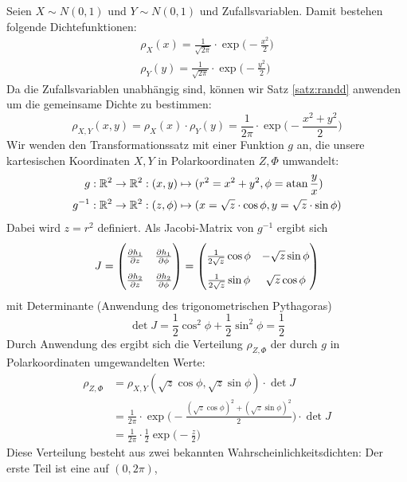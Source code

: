 Seien $X\sim N(0,1)$ und $Y\sim N(0,1)$ 
und  Zufallsvariablen. Damit bestehen folgende
Dichtefunktionen:
\begin{align*}
\rho_X(x) = \frac{1}{\sqrt{2\pi}}\cdot\exp\Big(-\frac{x^2}{2}\Big)\\
\rho_Y(y) = \frac{1}{\sqrt{2\pi}}\cdot\exp\Big(-\frac{y^2}{2}\Big)
\end{align*}
Da die Zufallsvariablen unabhängig sind, können wir Satz \ref{satz:randd}
anwenden um die gemeinsame Dichte zu bestimmen:
\[
\rho_{X,Y}(x,y) = \rho_X(x)\cdot\rho_Y(y) =
\frac{1}{2\pi}\cdot\exp\Big(-\frac{x^2+y^2}{2}\Big)
\]
Wir wenden den Transformationssatz mit einer Funktion $g$ an, die unsere
kartesischen Koordinaten $X,Y$ in Polarkoordinaten  $Z,\Phi$
umwandelt:
\begin{align*}
g: \mathbb{R}^2 \to \mathbb{R}^2: (x,y) &\mapsto (r^2 =x^2+y^2,\phi=\operatorname{atan}\frac{y}{x}) \\
g^{-1}: \mathbb{R}^2 \to \mathbb{R}^2: (z,\phi) &\mapsto (x=\sqrt{z}\cdot\cos\phi,y=\sqrt{z}\cdot\sin\phi)
\end{align*}
Dabei wird $z=r^2$ definiert. Als Jacobi-Matrix von $g^{-1}$ ergibt sich
\[
\renewcommand*{\arraystretch}{1.8}
J = \begin{pmatrix}\pd{h_1}{z} & \pd{h_1}{\phi} \\ \pd{h_2}{z} & \pd{h_2}{\phi}\end{pmatrix}
 = \begin{pmatrix}\frac{1}{2\sqrt{z}}\cos\phi & -\sqrt{z}\sin\phi \\
                  \frac{1}{2\sqrt{z}}\sin\phi &  \sqrt{z}\cos\phi\end{pmatrix}
\]
mit Determinante (Anwendung des trigonometrischen Pythagoras)
\[
\det J = \frac{1}{2}\cos^2\phi + \frac{1}{2}\sin^2\phi = \frac{1}{2}
\]
Durch Anwendung des  ergibt sich die
Verteilung $\rho_{Z,\Phi}$ der durch $g$ in Polarkoordinaten umgewandelten
Werte:
\begin{align*}
\rho_{Z,\Phi} &= \rho_{X,Y}(\sqrt{z}\cos\phi,\sqrt{z}\sin\phi)\cdot\det J \\
  &= \frac{1}{2\pi}\cdot
        \exp\Big(-\frac{(\sqrt{z}\cos\phi)^2+(\sqrt{z}\sin\phi)^2}{2}\Big)
        \cdot\det J \\
  &= \frac{1}{2\pi}\cdot\frac{1}{2}\exp\Big(-\frac{z}{2}\Big)
\end{align*}
Diese Verteilung besteht aus zwei bekannten Wahrscheinlichkeitsdichten: Der
erste Teil ist eine  auf $(0,2\pi)$,
